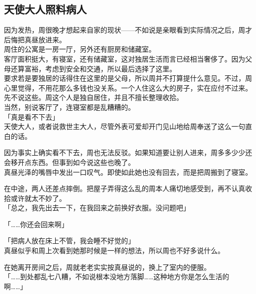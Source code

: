 \subsection{天使大人照料病人}

因为发热，周很晚才想起来自家的现状——不如说是亲眼看到实际情况之后，周才后悔把真昼放进来。\\

周住的公寓是一房一厅，另外还有厨房和储藏室。\\

客厅面积挺大，有寝室，还有储藏室，这对独居生活而言已经相当奢侈了。因为父母还算富裕，考虑到安全和交通，所以最后选择了这里。\\

要求若是要独居的话得住在这里的是父母，所以周并不打算提什么意见。不过，周心里觉得，不用花那么多钱也没关系。一个人住这么大的房子，实在应付不过来。\\

先不说这些。周这个人是独自居住，并且不擅长整理收拾。\\

当然，别说客厅了，连寝室都是乱糟糟的。\\

「真是看不下去」\\

天使大人，或者说救世主大人，尽管外表可爱却开门见山地给周奉送了这么一句直白的话。

因为事实上确实看不下去，周也无法反驳。如果知道要让别人进来，周多多少少还会移开点东西。但事到如今说这些也晚了。\\

真昼光泽的嘴唇中发出一口叹气。即使如此她也没有回去，而是把周搬到了寝室。

在中途，两人还差点摔倒。把屋子弄得这么乱的周本人痛切地感受到，再不认真收拾或许就太不妙了。\\

「总之，我先出去一下，在我回来之前换好衣服。没问题吧」

「……你还会回来啊」

「把病人放在床上不管，我会睡不好觉的」\\

真昼似乎和周上次看到她那时候是一样的想法，所以周也不好多说什么。

在她离开房间之后，周就老老实实按真昼说的，换上了室内的便服。\\

「……到处都乱七八糟，不如说根本没地方落脚……这种地方你是怎么生活的啊……」\\

